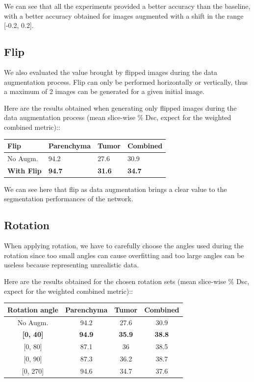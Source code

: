 We can see that all the experiments provided a better accuracy than the
baseline, with a better accuracy obtained for images augmented with a
shift in the range {[}-0.2, 0.2{]}.

\subsection*{Flip}\label{flip}

We also evaluated the value brought by flipped images during the data
augmentation process. Flip can only be performed horizontally or
vertically, thus a maximum of 2 images can be generated for a given
initial image.

Here are the results obtained when generating only flipped images during
the data augmentation process (mean slice-wise \% Dsc, expect for the weighted combined metric)::

\begin{longtable}[c]{@{}llll@{}}
\toprule
\textbf{Flip} & \textbf{Parenchyma} & \textbf{Tumor} &
\textbf{Combined}\tabularnewline
\midrule
\endhead
No Augm. & 94.2 & 27.6 & 30.9\tabularnewline
\textbf{With Flip} & \textbf{94.7} & \textbf{31.6} &
\textbf{34.7}\tabularnewline
\bottomrule
\end{longtable}

We can see here that flip as data augmentation brings a clear value to
the segmentation performances of the network.

\subsection*{Rotation}\label{rotation}

When applying rotation, we have to carefully choose the angles used
during the rotation since too small angles can cause overfitting and too
large angles can be useless because representing unrealistic data.

Here are the results obtained for the chosen rotation sets (mean slice-wise \% Dsc, expect for the weighted combined metric)::

\begin{longtable}[c]{@{}cccc@{}}
\toprule
\textbf{Rotation angle} & \textbf{Parenchyma} & \textbf{Tumor} &
\textbf{Combined}\tabularnewline
\midrule
\endhead
No Augm. & 94.2 & 27.6 & 30.9\tabularnewline
\hline
\textbf{{[}0, 40{]}} & \textbf{94.9} & \textbf{35.9} & \textbf{38.8}\tabularnewline
{[}0, 80{]} & 87.1 & 36 & 38.5\tabularnewline
{[}0, 90{]} & 87.3 & 36.2 & 38.7\tabularnewline
{[}0, 270{]} & 94.6 & 34.7 & 37.6\tabularnewline
\bottomrule
\end{longtable}

